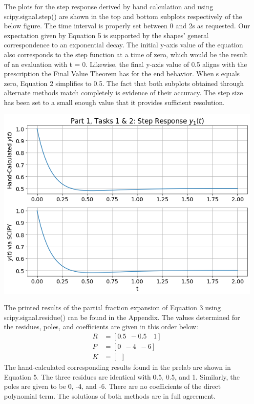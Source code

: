 \documentclass[12pt]{report}
\begin{document}
The plots for the step response derived by hand calculation and using scipy.signal.step() are shown in the top and bottom subplots respectively of the below figure. The time interval is properly set between 0 and 2s as requested. Our expectation given by Equation 5 is supported by the shapes' general correspondence to an exponential decay. The initial y-axis value of the equation also corresponds to the step function at a time of zero, which would be the result of an evaluation with t = 0. Likewise, the final y-axis value of 0.5 aligns with the prescription the Final Value Theorem has for the end behavior. When s equals zero, Equation 2 simplifies to 0.5. The fact that both subplots obtained through alternate methods match completely is evidence of their accuracy.  The step size has been set to a small enough value that it provides sufficient resolution. \\
	
\begin{center}
	\includegraphics[scale = 0.6]{Lab 6 - Plots/Part1-Tasks1&2.png}\\[1.0 cm]
\end{center}

The printed results of the partial fraction expansion of Equation 3 using scipy.signal.residue() can be found in the Appendix. The values determined for the residues, poles, and coefficients are given in this order below:
\begin{align*}
	R &= [0.5\enspace -\!0.5\quad 1] \\
	P &= [0\enspace -\!4\enspace -\!6] \\
	K &= [\enspace]
\end{align*}
The hand-calculated corresponding results found in the prelab are shown in Equation 5. The three residues are identical with 0.5, 0.5, and 1. Similarly, the poles are given to be 0, -4, and -6. There are no coefficients of the direct polynomial term. The solutions of both methods are in full agreement. \\
\end{document}
